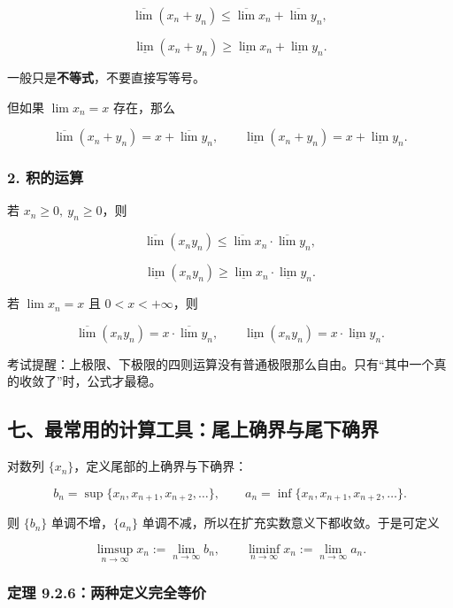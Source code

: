 \[
      \overline{\lim}(x_n+y_n)
      \le
      \overline{\lim}x_n+\overline{\lim}y_n,
    \]

\[
      \underline{\lim}(x_n+y_n)
      \ge
      \underline{\lim}x_n+\underline{\lim}y_n.
    \]

一般只是\textbf{不等式}，不要直接写等号。

但如果 \(\lim x_n=x\) 存在，那么

\[
      \overline{\lim}(x_n+y_n)=x+\overline{\lim}y_n,
      \qquad
      \underline{\lim}(x_n+y_n)=x+\underline{\lim}y_n.
    \]

\subsubsection*{2. 积的运算}

若 \(x_n\ge0,\ y_n\ge0\)，则

\[
      \overline{\lim}(x_ny_n)
      \le
      \overline{\lim}x_n\cdot\overline{\lim}y_n,
    \]

\[
      \underline{\lim}(x_ny_n)
      \ge
      \underline{\lim}x_n\cdot\underline{\lim}y_n.
    \]

若 \(\lim x_n=x\) 且 \(0<x<+\infty\)，则

\[
      \overline{\lim}(x_ny_n)=x\cdot\overline{\lim}y_n,
      \qquad
      \underline{\lim}(x_ny_n)=x\cdot\underline{\lim}y_n.
    \]

\begin{notebox}
考试提醒：上极限、下极限的四则运算没有普通极限那么自由。只有“其中一个真的收敛了”时，公式才最稳。
\end{notebox}

\subsection*{七、最常用的计算工具：尾上确界与尾下确界}

对数列 \(\{x_n\}\)，定义尾部的上确界与下确界：

\[
      b_n=\sup\{x_n,x_{n+1},x_{n+2},\ldots\},
      \qquad
      a_n=\inf\{x_n,x_{n+1},x_{n+2},\ldots\}.
    \]

则 \(\{b_n\}\) 单调不增，\(\{a_n\}\) 单调不减，所以在扩充实数意义下都收敛。于是可定义

\[
      \limsup_{n\to\infty}x_n:=\lim_{n\to\infty}b_n,
      \qquad
      \liminf_{n\to\infty}x_n:=\lim_{n\to\infty}a_n.
    \]

\subsubsection*{定理 9.2.6：两种定义完全等价}

